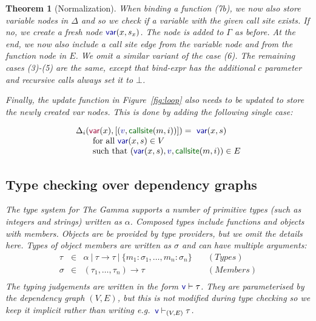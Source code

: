 \documentclass[acmsmall,anonymous,fleqn]{acmart}\settopmatter{printfolios=false,printccs=false,printacmref=false}
\newcounter{thc}
\theoremstyle{plain}
\newtheorem{theorem}[thc]{Theorem}
\theoremstyle{definition}
\newcommand{\ident}[1]{\textnormal{\textcolor{idclr}{\sffamily #1}}}
\newcommand{\bndclr}[1]{\textcolor{kvdclr}{#1}}
\newcommand{\bnd}[1]{\textnormal{\textcolor{kvdclr}{\sffamily #1}}}
\newcommand{\bknd}[1]{\textnormal{\textcolor{prepclr}{\sffamily #1}}}
\newcommand{\blbl}[1]{\textnormal{\textcolor{numclr}{\sffamily #1}}}
\begin{document}
\begin{theorem}[Normalization]
When binding a function (7b), we now also store variable nodes in $\Delta$ and so we check if a
variable with the given call site exists. If no, we create a fresh node $\bnd{var}(x, s_x)$.
The node is added to $\Gamma$ as before. At the end, we now also include a call site edge from the
variable node and from the function node in $E$. We omit a similar variant of the case (6).
The remaining cases (3)-(5) are the same, except that \ident{bind-expr} has the additional $c$ parameter
and recursive calls always set it to $\bot$.

Finally, the \ident{update} function in Figure~\ref{fig:loop} also needs to be updated to store the
newly created \bnd{var} nodes. This is done by adding the following single case:

\begin{equation*}
\begin{array}{l}
\Delta_{i}(\bknd{var}(x), [(\bndclr{v},\blbl{callsite}(m,i))]) = \bnd{var}(x, s)\\
\quad\quad \textnormal{for all}~\bnd{var}(x, s) \in V\\
\quad\quad \textnormal{such that}~(\bnd{var}(x, s), \bndclr{v}, \blbl{callsite}(m,i)) \in E
\end{array}
\end{equation*}


\subsection{Type checking over dependency graphs}
\label{sec:types-graph}

The type system for The Gamma supports a number of primitive types (such as integers and strings)
written as $\alpha$. Composed types include functions and objects with members. Objects are be
provided by type providers, but we omit the details here. Types of object members are written as
$\sigma$ and can have multiple arguments:
%
\begin{equation*}
\begin{array}{lcll}
\tau&\in&\alpha ~|~ \tau \rightarrow \tau ~|~ \{m_1\!:\!\sigma_1, \ldots, m_n\!:\!\sigma_n\} &\quad(\textit{Types})\\
\sigma &\in& (\tau_1, \ldots, \tau_n) \rightarrow \tau &\quad(\textit{Members})\\
\end{array}
\end{equation*}
%
The typing judgements are written in the form $\bnd{v}\vdash \tau$. They are parameterised by the
dependency graph $(V, E)$, but this is not modified during type checking so we keep it implicit
rather than writing e.g.~$\bnd{v}\vdash_{(V,E)} \tau$.


\end{theorem}
\end{document}
